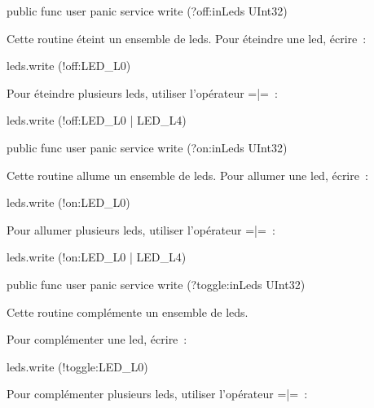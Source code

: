 
\begin{OMNIBUS}
  public func user panic service write (?off:inLeds UInt32)
\end{OMNIBUS}

Cette routine éteint un ensemble de leds. Pour éteindre une led, écrire~:

\begin{OMNIBUS}
  leds.write (!off:LED_L0)
\end{OMNIBUS}

 Pour éteindre plusieurs leds, utiliser l'opérateur \omnibus=|=~:

\begin{OMNIBUS}
  leds.write (!off:LED_L0 | LED_L4)
\end{OMNIBUS}




\begin{OMNIBUS}
  public func user panic service write (?on:inLeds UInt32)
\end{OMNIBUS}

Cette routine allume un ensemble de leds. Pour allumer une led, écrire~:

\begin{OMNIBUS}
  leds.write (!on:LED_L0)
\end{OMNIBUS}

 Pour allumer plusieurs leds, utiliser l'opérateur \omnibus=|=~:

\begin{OMNIBUS}
  leds.write (!on:LED_L0 | LED_L4)
\end{OMNIBUS}




\begin{OMNIBUS}
  public func user panic service write (?toggle:inLeds UInt32)
\end{OMNIBUS}

Cette routine complémente un ensemble de leds.

Pour complémenter une led, écrire~:

\begin{OMNIBUS}
  leds.write (!toggle:LED_L0)
\end{OMNIBUS}

Pour complémenter plusieurs leds, utiliser l'opérateur \omnibus=|=~:

